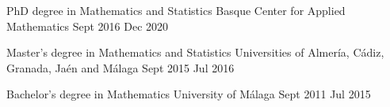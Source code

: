 
		\nopagebreak	
		\begin{education} 
			{PhD degree in Mathematics and Statistics}
			{Basque Center for Applied Mathematics}
			{Sept 2016}
			{Dec 2020}
		\end{education}

		\begin{education} 
			{Master's degree in Mathematics and Statistics}
			{Universities of Almer\'ia, C\'adiz, Granada, Ja\'en and M\'alaga}
			{Sept 2015}
			{Jul 2016}
		\end{education}

		\begin{firsteducation} 
			{Bachelor's degree in Mathematics}
			{University of M\'alaga}
			{Sept 2011}
			{Jul 2015}
		\end{firsteducation}